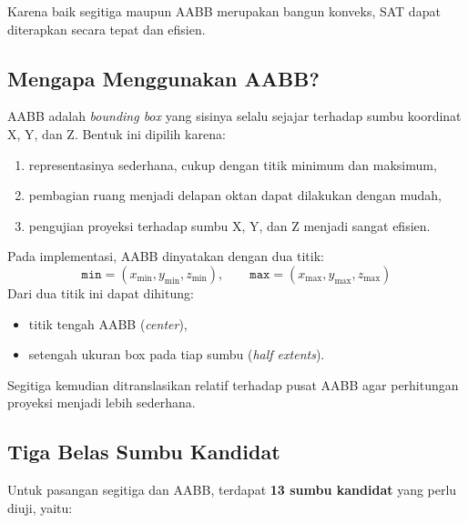 \documentclass[12pt, a4paper]{report}
\begin{document}
Karena baik segitiga maupun AABB merupakan bangun konveks, SAT dapat
diterapkan secara tepat dan efisien.

\subsection{Mengapa Menggunakan AABB?}

AABB adalah \textit{bounding box} yang sisinya selalu sejajar terhadap
sumbu koordinat X, Y, dan Z. Bentuk ini dipilih karena:
\begin{enumerate}
  \item representasinya sederhana, cukup dengan titik minimum dan
  maksimum,
  \item pembagian ruang menjadi delapan oktan dapat dilakukan dengan
  mudah,
  \item pengujian proyeksi terhadap sumbu X, Y, dan Z menjadi sangat
  efisien.
\end{enumerate}

Pada implementasi, AABB dinyatakan dengan dua titik:
\[
\texttt{min} = (x_{\min}, y_{\min}, z_{\min}), \qquad
\texttt{max} = (x_{\max}, y_{\max}, z_{\max})
\]
Dari dua titik ini dapat dihitung:
\begin{itemize}
  \item titik tengah AABB (\textit{center}),
  \item setengah ukuran box pada tiap sumbu (\textit{half extents}).
\end{itemize}

Segitiga kemudian ditranslasikan relatif terhadap pusat AABB agar
perhitungan proyeksi menjadi lebih sederhana.

\subsection{Tiga Belas Sumbu Kandidat}

Untuk pasangan segitiga dan AABB, terdapat \textbf{13 sumbu kandidat}
yang perlu diuji, yaitu:
\end{document}

